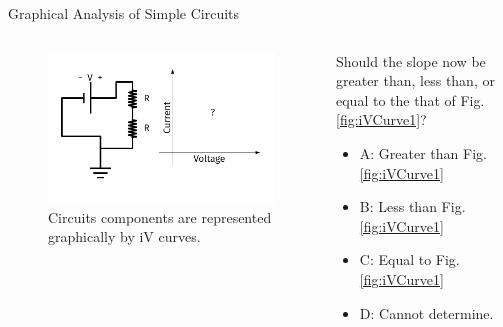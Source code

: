 \documentclass{beamer}
\begin{document}
\begin{frame}{Graphical Analysis of Simple Circuits}
\begin{columns}[T]
\begin{column}{0.5\textwidth}
\begin{figure}
\centering
\includegraphics[width=\textwidth,trim=0.5cm 0cm 1cm 0cm,clip=true]{figures/iVCurve2.pdf}
\caption{\label{fig:iVCurve2} Circuits components are represented graphically by iV curves.}
\end{figure}
\end{column}
\begin{column}{0.5\textwidth}
\small
Should the slope now be greater than, less than, or equal to the that of Fig. \ref{fig:iVCurve1}?
\begin{itemize}
\item A: Greater than Fig. \ref{fig:iVCurve1}
\item B: Less than Fig. \ref{fig:iVCurve1}
\item C: Equal to Fig. \ref{fig:iVCurve1}
\item D: Cannot determine.
\end{itemize}
\end{column}
\end{columns}
\end{frame}
\end{document}

